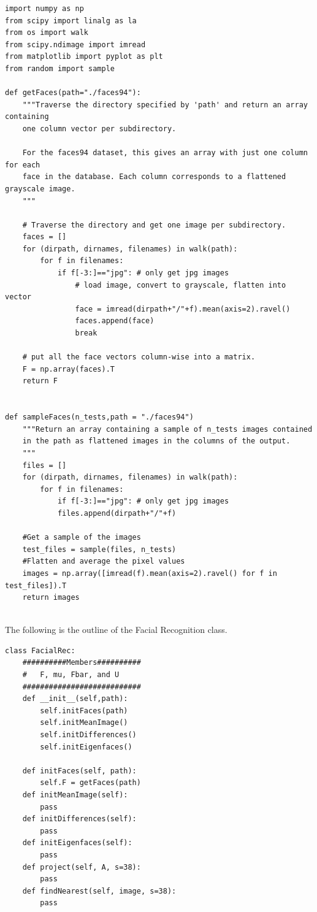 \begin{lstlisting}
import numpy as np
from scipy import linalg as la
from os import walk
from scipy.ndimage import imread
from matplotlib import pyplot as plt
from random import sample

def getFaces(path="./faces94"):
    """Traverse the directory specified by 'path' and return an array containing
    one column vector per subdirectory.
    
    For the faces94 dataset, this gives an array with just one column for each
    face in the database. Each column corresponds to a flattened grayscale image.
    """
    
    # Traverse the directory and get one image per subdirectory.
    faces = []
    for (dirpath, dirnames, filenames) in walk(path):
        for f in filenames:
            if f[-3:]=="jpg": # only get jpg images
                # load image, convert to grayscale, flatten into vector
                face = imread(dirpath+"/"+f).mean(axis=2).ravel() 
                faces.append(face)
                break
        
    # put all the face vectors column-wise into a matrix.
    F = np.array(faces).T
    return F


def sampleFaces(n_tests,path = "./faces94")
    """Return an array containing a sample of n_tests images contained 
    in the path as flattened images in the columns of the output.
    """
    files = []
    for (dirpath, dirnames, filenames) in walk(path):
        for f in filenames:
            if f[-3:]=="jpg": # only get jpg images
            files.append(dirpath+"/"+f)
            
    #Get a sample of the images
    test_files = sample(files, n_tests)
    #Flatten and average the pixel values
    images = np.array([imread(f).mean(axis=2).ravel() for f in test_files]).T
    return images
    
\end{lstlisting}

The following is the outline of the Facial Recognition class.

\begin{lstlisting}
class FacialRec:
    ##########Members##########
    #   F, mu, Fbar, and U 
    ###########################
    def __init__(self,path):
        self.initFaces(path)
        self.initMeanImage()
        self.initDifferences()
        self.initEigenfaces()

    def initFaces(self, path):
        self.F = getFaces(path)
    def initMeanImage(self):
        pass
    def initDifferences(self):
        pass
    def initEigenfaces(self):
        pass
    def project(self, A, s=38):
        pass
    def findNearest(self, image, s=38):
        pass
\end{lstlisting}
